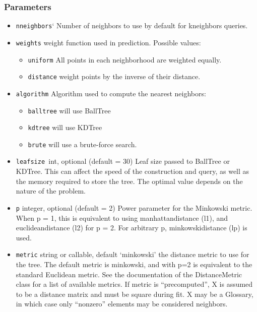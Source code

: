 \documentclass[12pt]{article}
\begin{document}
\subsubsection{Parameters}
\begin{itemize}
\item \texttt{n\textunderscore neighbors}`
Number of neighbors to use by default for kneighbors queries.

\item
\texttt{weights}
weight function used in prediction. Possible values:

\begin{itemize}

\item \texttt{uniform} All points in each neighborhood are weighted equally.

\item \texttt{distance} weight points by the inverse of their distance.

\end{itemize}

\item \texttt{algorithm} Algorithm used to compute the nearest neighbors:

\begin{itemize}
\item
\texttt{ball\textunderscore tree} will use BallTree
\item
\texttt{kd\textunderscore tree} will use KDTree
\item
\texttt{brute} will use a brute-force search.

\end{itemize}
\item \texttt{leaf\textunderscore size }int, optional (default = 30)
Leaf size passed to BallTree or KDTree. This can affect the speed of the construction and query, as well as the memory required to store the tree. The optimal value depends on the nature of the problem.

\item \texttt{p} integer, optional (default = 2)
Power parameter for the Minkowski metric. When p = 1, this is equivalent to using manhattan\textunderscore distance (l1), and euclidean\textunderscore distance (l2) for p = 2. For arbitrary p, minkowski\textunderscore distance (l\textunderscore p) is used.

\item \texttt{metric} string or callable, default ‘minkowski’
the distance metric to use for the tree. The default metric is minkowski, and with p=2 is equivalent to the standard Euclidean metric. See the documentation of the DistanceMetric class for a list of available metrics. If metric is “precomputed”, X is assumed to be a distance matrix and must be square during fit. X may be a Glossary, in which case only “nonzero” elements may be considered neighbors.


\end{itemize}
\end{document}
